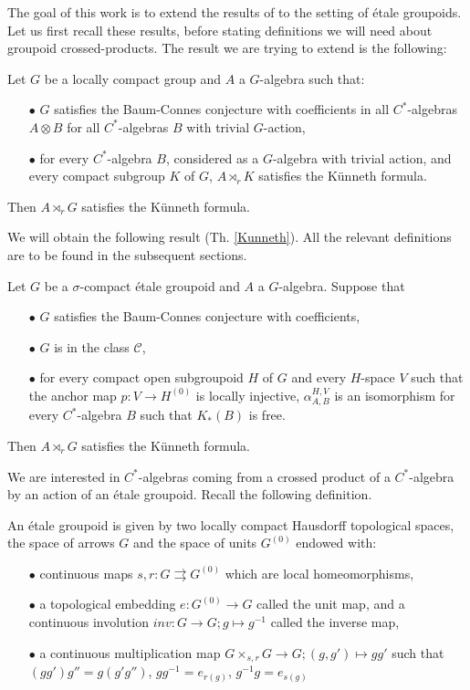 The goal of this work is to extend the results of \cite{ChabertEOY} to the setting of \'etale groupoids. Let us first recall these results, before stating definitions we will need about groupoid crossed-products. The result we are trying to extend is the following:

\begin{thm} Let $G$ be a locally compact group and $A$ a $G$-algebra such that:
\begin{itemize}
\item[$\bullet$] $G$ satisfies the Baum-Connes conjecture with coefficients in all $C^*$-algebras $A\otimes B$ for all $C^*$-algebras $B$ with trivial $G$-action,
\item[$\bullet$] for every $C^*$-algebra $B$, considered as a $G$-algebra with trivial action, and every compact subgroup $K$ of $G$, $A\rtimes_r K$ satisfies the Künneth formula.
\end{itemize}
Then $A\rtimes_r G$ satisfies the Künneth formula.
\end{thm}

We will obtain the following result (Th. \ref{Kunneth}). All the relevant definitions are to be found in the subsequent sections.

\begin{thm}
Let $G$ be a $\sigma$-compact étale groupoid and $A$ a $G$-algebra. Suppose that 
\begin{itemize}
\item[$\bullet$] $G$ satisfies the Baum-Connes conjecture with coefficients,
\item[$\bullet$] $G$ is in the class $\mathcal C$,
\item[$\bullet$] for every compact open subgroupoid $H$ of $G$ and every $H$-space $V$ such that the anchor map $p : V \rightarrow H^{(0)}$ is locally injective, $\alpha_{A,B}^{H,V}$ is an isomorphism for every $C^*$-algebra $B$ such that $K_*(B)$ is free.
\end{itemize} 
Then $A\rtimes_r G$ satisfies the Künneth formula.
\end{thm}

We are interested in $C^*$-algebras coming from a crossed product of a $C^*$-algebra by an action of an \'etale groupoid. Recall the following definition.

\begin{definition}
An étale groupoid is given by two locally compact Hausdorff topological spaces, the space of arrows $G$ and the space of units $G^{(0)}$ endowed with:
\begin{itemize}
\item[$\bullet$] continuous maps $s,r : G \rightrightarrows G^{(0)}$ which are local homeomorphisms,
\item[$\bullet$] a topological embedding $e: G^{(0)}\rightarrow G$ called the unit map, and a continuous involution $inv : G\rightarrow G; g\mapsto g^{-1}$ called the inverse map,
\item[$\bullet$] a continuous multiplication map $G\times_{s,r}G\rightarrow G; (g,g')\mapsto gg'$ such that $(gg')g'' = g(g'g'')$, $gg^{-1}= e_{r(g)}$, $g^{-1}g= e_{s(g)}$
\end{itemize}
\end{definition}

